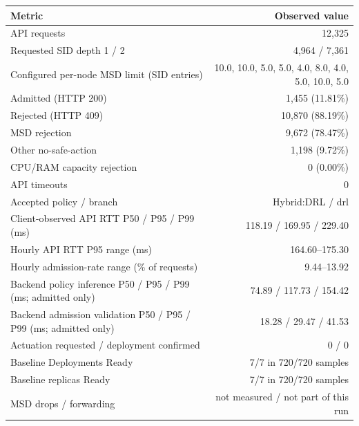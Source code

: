 \begin{tabular}{@{}lr@{}}
\toprule
Metric & Observed value \\
\midrule
API requests & 12,325 \\
Requested SID depth 1 / 2 & 4,964 / 7,361 \\
Configured per-node MSD limit (SID entries) & 10.0, 10.0, 5.0, 5.0, 4.0, 8.0, 4.0, 5.0, 10.0, 5.0 \\
Admitted (HTTP 200) & 1,455 (11.81\%) \\
Rejected (HTTP 409) & 10,870 (88.19\%) \\
\quad MSD rejection & 9,672 (78.47\%) \\
\quad Other no-safe-action & 1,198 (9.72\%) \\
\quad CPU/RAM capacity rejection & 0 (0.00\%) \\
API timeouts & 0 \\
Accepted policy / branch & Hybrid:DRL / drl \\
Client-observed API RTT P50 / P95 / P99 (ms) & 118.19 / 169.95 / 229.40 \\
Hourly API RTT P95 range (ms) & 164.60--175.30 \\
Hourly admission-rate range (\% of requests) & 9.44--13.92 \\
Backend policy inference P50 / P95 / P99 (ms; admitted only) & 74.89 / 117.73 / 154.42 \\
Backend admission validation P50 / P95 / P99 (ms; admitted only) & 18.28 / 29.47 / 41.53 \\
Actuation requested / deployment confirmed & 0 / 0 \\
Baseline Deployments Ready & 7/7 in 720/720 samples \\
Baseline replicas Ready & 7/7 in 720/720 samples \\
MSD drops / forwarding & not measured / not part of this run \\
\bottomrule
\end{tabular}
